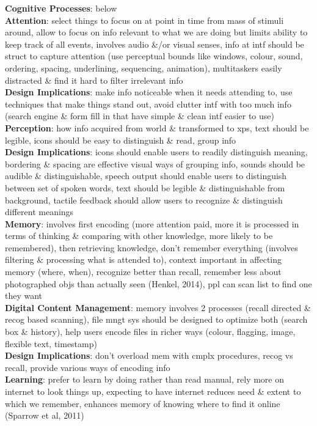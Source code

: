 \documentclass[a4paper]{article}
\begin{document}
\begin{multicols}{3}
        \textbf{Cognitive Processes}: below\\
        \textbf{Attention}: select things to focus on at point in time from mass of stimuli around, allow to focus on info relevant to what we are doing but limits ability to keep track of all events, involves audio \&/or visual senses, info at intf should be struct to capture attention (use perceptual bounds like windows, colour, sound, ordering, spacing, underlining, sequencing, animation), multitaskers easily distracted \& find it hard to filter irrelevant info\\
        \textbf{Design Implications}: make info noticeable when it needs attending to, use techniques that make things stand out, avoid clutter intf with too much info (search engine \& form fill in that have simple \& clean intf easier to use)\\
        \textbf{Perception}: how info acquired from world \& transformed to xps, text should be legible, icons should be easy to distinguish \& read, group info\\
        \textbf{Design Implications}: icons should enable users to readily distinguish meaning, bordering \& spacing are effective visual ways of grouping info, sounds should be audible \& distinguishable, speech output should enable users to distinguish between set of spoken words, text should be legible \& distinguishable from background, tactile feedback should allow users to recognize \& distinguish different meanings\\
        \textbf{Memory}: involves first encoding (more attention paid, more it is processed in terms of thinking \& comparing with other knowledge, more likely to be remembered), then retrieving knowledge, don't remember everything (involves filtering \& processing what is attended to), context important in affecting memory (where, when), recognize better than recall, remember less about photographed objs than actually seen (Henkel, 2014), ppl can scan list to find one they want\\
        \textbf{Digital Content Management}: memory involves 2 processes (recall directed \& recog based scanning), file mngt sys should be designed to optimize both (search box \& history), help users encode files in richer ways (colour, flagging, image, flexible text, timestamp)\\
        \textbf{Design Implications}: don't overload mem with cmplx procedures, recog vs recall, provide various ways of encoding info\\
        \textbf{Learning}: prefer to learn by doing rather than read manual, rely more on internet to look things up, expecting to have internet reduces need \& extent to which we remember, enhances memory of knowing where to find it online (Sparrow et al, 2011)\\

\end{multicols}
\end{document}
